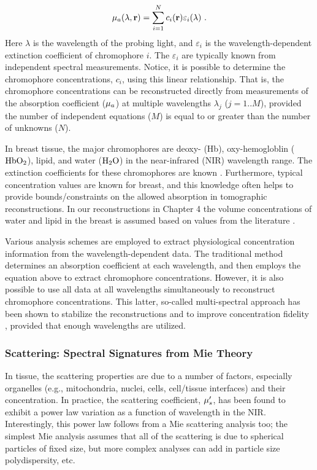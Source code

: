 \begin{equation}
\label{eqn:Chromo}
\mu_a(\lambda,\mathbf{r}) = \sum_{i=1}^N c_i(\mathbf{r}) \varepsilon_i(\lambda) \ .
\end{equation}
Here $\lambda$ is the wavelength of the probing light, and $\varepsilon_i$ is the wavelength-dependent extinction coefficient of chromophore $i$. The $\varepsilon_i$ are typically known from independent spectral measurements. Notice, it is possible to determine the chromophore concentrations, $c_i$, using this linear relationship. That is, the chromophore concentrations can be reconstructed directly from measurements of the absorption coefficient ($\mu_a$) at multiple wavelengths $\lambda_j$ ($j=1..M$), provided the number of independent equations ($M$) is equal to or greater than the number of unknowns ($N$). 

In breast tissue, the major chromophores are deoxy- (Hb), oxy-hemogloblin (${\rm HbO_2}$), lipid, and water (${\rm H_2O}$) in the near-infrared (NIR) wavelength range. The extinction coefficients for these chromophores are known \cite{Mourant1997,Doornbos1999,Wang2012,Jacques2013}. Furthermore, typical concentration values are known for breast, and this knowledge often helps to provide bounds/constraints on the allowed absorption in tomographic reconstructions. In our reconstructions in Chapter 4 the volume concentrations of water and lipid in the breast is assumed based on values from the literature \cite{Lee1997,White1987,Woodard1986}. 

Various analysis schemes are employed to extract physiological concentration information from the wavelength-dependent data. The traditional method determines an absorption coefficient at each wavelength, and then employs the equation above to extract chromophore concentrations. However, it is also possible to use all data at all wavelengths simultaneously to reconstruct chromophore concentrations. This latter, so-called multi-spectral approach has been shown to stabilize the reconstructions and to improve concentration fidelity \cite{Corlu2003,Srinivasan2005,Li2007}, provided that enough wavelengths are utilized.
%
\subsubsection{Scattering: Spectral Signatures from Mie Theory}
In tissue, the scattering properties are due to a number of factors, especially organelles (e.g., mitochondria, nuclei, cells, cell/tissue interfaces) and their concentration. In practice, the scattering coefficient, $\mu_s^{\prime}$, has been found to exhibit a power law variation as a function of wavelength in the NIR. Interestingly, this power law follows from a Mie scattering analysis too; the simplest Mie analysis assumes that all of the scattering is due to spherical particles of fixed size, but more complex analyses can add in particle size polydispersity, etc.

